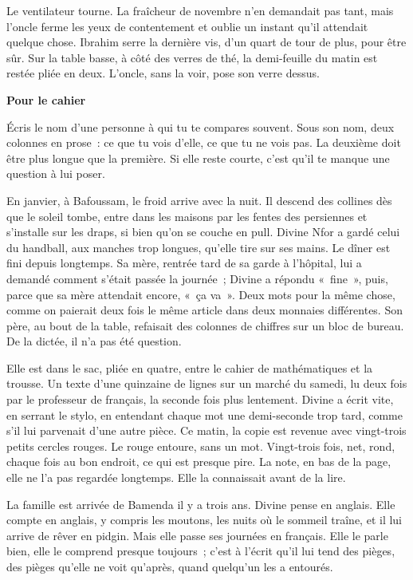 \documentclass[10.5pt,twoside,openright]{book}
\newenvironment{pourcahier}[1]{\par\vspace{0.9em}\begin{tcolorbox}[colback=black!4,colframe=accent,boxrule=0pt,leftrule=2.2pt,arc=0pt,left=8pt,right=8pt,top=5pt,bottom=5pt]\small\textbf{#1}\par\smallskip}{\end{tcolorbox}\par}
\newcommand{\chapitre}[2]{\cleardoublepage\markright{#2}\thispagestyle{plain}\vspace*{2.2cm}{\noindent\color{accent}\fontsize{54}{54}\selectfont\bfseries #1}\par\vspace{0.5em}{\noindent\LARGE\bfseries #2\par}\vspace{1.6em}\noindent\ignorespaces}
\begin{document}
Le ventilateur tourne. La fraîcheur de novembre n’en demandait pas tant, mais l’oncle ferme les yeux de contentement et oublie un instant qu’il attendait quelque chose. Ibrahim serre la dernière vis, d’un quart de tour de plus, pour être sûr. Sur la table basse, à côté des verres de thé, la demi-feuille du matin est restée pliée en deux. L’oncle, sans la voir, pose son verre dessus.

\begin{pourcahier}{Pour le cahier}
Écris le nom d’une personne à qui tu te compares souvent. Sous son nom, deux colonnes en prose : ce que tu vois d’elle, ce que tu ne vois pas. La deuxième doit être plus longue que la première. Si elle reste courte, c’est qu’il te manque une question à lui poser.
\end{pourcahier}


\chapitre{5}{La voix de dedans}

En janvier, à Bafoussam, le froid arrive avec la nuit. Il descend des collines dès que le soleil tombe, entre dans les maisons par les fentes des persiennes et s’installe sur les draps, si bien qu’on se couche en pull. Divine Nfor a gardé celui du handball, aux manches trop longues, qu’elle tire sur ses mains. Le dîner est fini depuis longtemps. Sa mère, rentrée tard de sa garde à l’hôpital, lui a demandé comment s’était passée la journée ; Divine a répondu « fine », puis, parce que sa mère attendait encore, « ça va ». Deux mots pour la même chose, comme on paierait deux fois le même article dans deux monnaies différentes. Son père, au bout de la table, refaisait des colonnes de chiffres sur un bloc de bureau. De la dictée, il n’a pas été question.

Elle est dans le sac, pliée en quatre, entre le cahier de mathématiques et la trousse. Un texte d’une quinzaine de lignes sur un marché du samedi, lu deux fois par le professeur de français, la seconde fois plus lentement. Divine a écrit vite, en serrant le stylo, en entendant chaque mot une demi-seconde trop tard, comme s’il lui parvenait d’une autre pièce. Ce matin, la copie est revenue avec vingt-trois petits cercles rouges. Le rouge entoure, sans un mot. Vingt-trois fois, net, rond, chaque fois au bon endroit, ce qui est presque pire. La note, en bas de la page, elle ne l’a pas regardée longtemps. Elle la connaissait avant de la lire.

La famille est arrivée de Bamenda il y a trois ans. Divine pense en anglais. Elle compte en anglais, y compris les moutons, les nuits où le sommeil traîne, et il lui arrive de rêver en pidgin. Mais elle passe ses journées en français. Elle le parle bien, elle le comprend presque toujours ; c’est à l’écrit qu’il lui tend des pièges, des pièges qu’elle ne voit qu’après, quand quelqu’un les a entourés.
\end{document}
